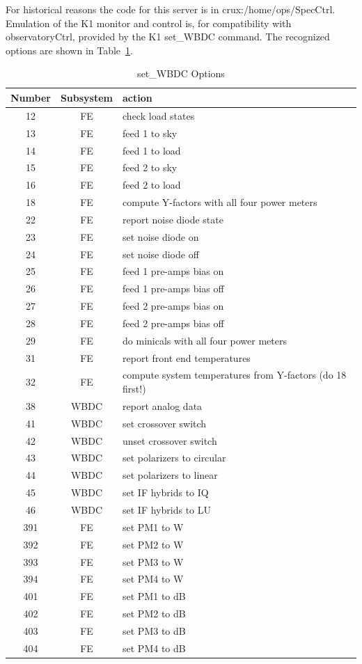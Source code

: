 \documentclass[letterpaper,11pt]{book}
\begin{document}
For historical reasons the code for this server is in 
{\ttfamily crux:/home/ops/SpecCtrl}.  Emulation of the K1 monitor and control
is, for compatibility with {\ttfamily observatoryCtrl}, provided by the K1 
{\ttfamily set\_WBDC} command.  The recognized options are shown in 
Table~\ref{tab:WBDCoptions}.
\begin{table}[h!tb]
 \begin{center}
  \caption{\label{tab:WBDCoptions}{\ttfamily set\_WBDC} Options}
  \begin{tabular}{|c|c|l|}
   \hline
   {\bfseries Number} & {\bfseries Subsystem} & {\bfseries action} \\
   \hline
     12 & FE   & check load states \\
     13 & FE   & feed 1 to sky \\
     14 & FE   & feed 1 to load \\
     15 & FE   & feed 2 to sky \\
     16 & FE   & feed 2 to load \\
     18 & FE   & compute Y-factors with all four power meters \\
     22 & FE   & report noise diode state\\
     23 & FE   & set noise diode on\\
     24 & FE   & set noise diode off\\
     25 & FE   & feed 1 pre-amps bias on\\
     26 & FE   & feed 1 pre-amps bias off\\
     27 & FE   & feed 2 pre-amps bias on\\
     28 & FE   & feed 2 pre-amps bias off\\
     29 & FE   & do minicals with all four power meters\\
     31 & FE   & report front end temperatures\\
     32 & FE   & compute system temperatures from Y-factors (do 18 first!)\\
     38 & WBDC & report analog data \\
     41 & WBDC & set crossover switch\\
     42 & WBDC & unset crossover switch\\
     43 & WBDC & set polarizers to circular\\
     44 & WBDC & set polarizers to linear\\
     45 & WBDC & set IF hybrids to IQ\\
     46 & WBDC & set IF hybrids to LU\\
     391 & FE   & set PM1 to W\\
     392 & FE   & set PM2 to W\\
     393 & FE   & set PM3 to W\\
     394 & FE   & set PM4 to W\\
     401 & FE   & set PM1 to dB\\
     402 & FE   & set PM2 to dB\\
     403 & FE   & set PM3 to dB\\
     404 & FE   & set PM4 to dB   \\
     \hline
  \end{tabular}
 \end{center}
\end{table}
\end{document}
